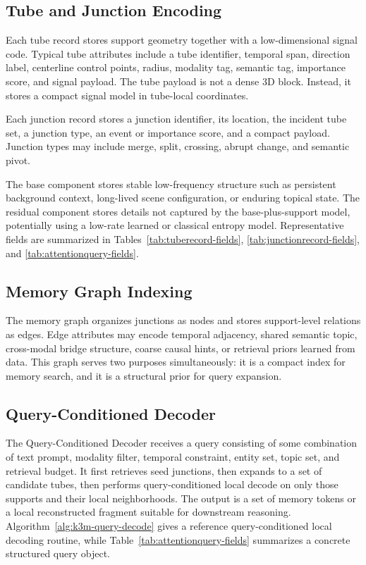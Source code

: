 \documentclass[11pt]{article}
\begin{document}
\subsection{Tube and Junction Encoding}
Each tube record stores support geometry together with a low-dimensional signal code. Typical tube attributes include a tube identifier, temporal span, direction label, centerline control points, radius, modality tag, semantic tag, importance score, and signal payload. The tube payload is not a dense 3D block. Instead, it stores a compact signal model in tube-local coordinates.

Each junction record stores a junction identifier, its location, the incident tube set, a junction type, an event or importance score, and a compact payload. Junction types may include merge, split, crossing, abrupt change, and semantic pivot.

The base component stores stable low-frequency structure such as persistent background context, long-lived scene configuration, or enduring topical state. The residual component stores details not captured by the base-plus-support model, potentially using a low-rate learned or classical entropy model.
Representative fields are summarized in Tables~\ref{tab:tuberecord-fields}, \ref{tab:junctionrecord-fields}, and \ref{tab:attentionquery-fields}.

\subsection{Memory Graph Indexing}
The memory graph organizes junctions as nodes and stores support-level relations as edges. Edge attributes may encode temporal adjacency, shared semantic topic, cross-modal bridge structure, coarse causal hints, or retrieval priors learned from data. This graph serves two purposes simultaneously: it is a compact index for memory search, and it is a structural prior for query expansion.

\subsection{Query-Conditioned Decoder}
The Query-Conditioned Decoder receives a query consisting of some combination of text prompt, modality filter, temporal constraint, entity set, topic set, and retrieval budget. It first retrieves seed junctions, then expands to a set of candidate tubes, then performs query-conditioned local decode on only those supports and their local neighborhoods. The output is a set of memory tokens or a local reconstructed fragment suitable for downstream reasoning.
Algorithm~\ref{alg:k3m-query-decode} gives a reference query-conditioned local decoding routine, while Table~\ref{tab:attentionquery-fields} summarizes a concrete structured query object.
\end{document}
